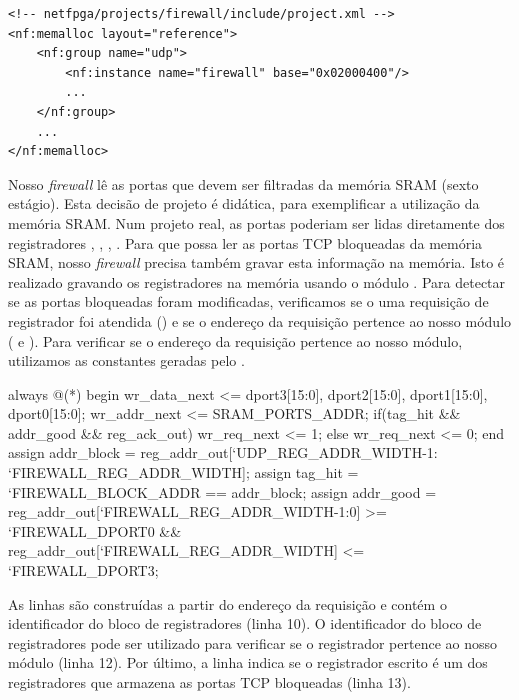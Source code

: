\begin{verbatim}
<!-- netfpga/projects/firewall/include/project.xml -->
<nf:memalloc layout="reference">
    <nf:group name="udp">
        <nf:instance name="firewall" base="0x02000400"/>
        ...
    </nf:group>
    ...
</nf:memalloc>
\end{verbatim}

Nosso \emph{firewall} lê as portas que devem ser filtradas da
memória SRAM (sexto estágio).  Esta decisão de projeto é didática,
para exemplificar a utilização da memória SRAM.  Num projeto real,
as portas poderiam ser lidas diretamente dos registradores
, , , .  Para que
possa ler as portas TCP bloqueadas da memória SRAM, nosso
\emph{firewall} precisa também gravar esta informação na memória.
Isto é realizado gravando os registradores na memória usando o
módulo .  Para detectar se as portas bloqueadas
foram modificadas, verificamos se o uma requisição de registrador
foi atendida () e se o endereço da requisição
pertence ao nosso módulo ( e ).  Para
verificar se o endereço da requisição pertence ao nosso módulo,
utilizamos as constantes geradas pelo .

\begin{verilogcode}
   always @(*) begin
      wr_data_next <= {dport3[15:0], dport2[15:0],
                       dport1[15:0], dport0[15:0]};
      wr_addr_next <= SRAM_PORTS_ADDR;
      if(tag_hit && addr_good && reg_ack_out)
         wr_req_next <= 1;
      else
         wr_req_next <= 0;
   end
   assign addr_block = reg_addr_out[`UDP_REG_ADDR_WIDTH-1:
                                    `FIREWALL_REG_ADDR_WIDTH];
   assign tag_hit = `FIREWALL_BLOCK_ADDR == addr_block;
   assign addr_good = reg_addr_out[`FIREWALL_REG_ADDR_WIDTH-1:0] >= 
    `FIREWALL_DPORT0 && reg_addr_out[`FIREWALL_REG_ADDR_WIDTH] <= 
    `FIREWALL_DPORT3;
\end{verilogcode}

As linhas  são construídas a partir do endereço da
requisição e contém o identificador do bloco de registradores (linha
10).  O identificador do bloco de registradores pode ser utilizado
para verificar se o registrador pertence ao nosso módulo (linha 12).
Por último, a linha  indica se o registrador escrito
é um dos registradores que armazena as portas TCP bloqueadas (linha
13).
